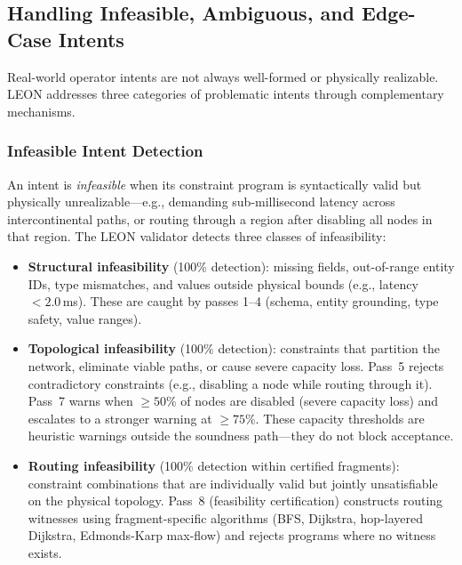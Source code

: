 
\subsection{Handling Infeasible, Ambiguous, and Edge-Case Intents}
\label{sec:infeasible_handling}

Real-world operator intents are not always well-formed or physically
realizable. LEON addresses three categories of problematic intents
through complementary mechanisms.

\subsubsection{Infeasible Intent Detection}

An intent is \textit{infeasible} when its constraint program is
syntactically valid but physically unrealizable---e.g., demanding
sub-millisecond latency across intercontinental paths, or routing through
a region after disabling all nodes in that region. The LEON validator
detects three classes of infeasibility:

\begin{itemize}
\item \textbf{Structural infeasibility} (100\% detection): missing fields,
out-of-range entity IDs, type mismatches, and values outside physical
bounds (e.g., latency $< 2.0$\,ms). These are caught by passes 1--4
(schema, entity grounding, type safety, value ranges).

\item \textbf{Topological infeasibility} (100\% detection): constraints
that partition the network, eliminate viable paths, or cause severe
capacity loss. Pass~5 rejects contradictory constraints (e.g., disabling
a node while routing through it). Pass~7 warns when $\geq 50\%$ of nodes are disabled (severe capacity
loss) and escalates to a stronger warning at $\geq 75\%$. These
capacity thresholds are heuristic warnings outside the soundness
path---they do not block acceptance.

\item \textbf{Routing infeasibility} (100\% detection within certified
fragments): constraint combinations that are individually valid but
jointly unsatisfiable on the physical topology. Pass~8 (feasibility
certification) constructs routing witnesses using fragment-specific
algorithms (BFS, Dijkstra, hop-layered Dijkstra, Edmonds-Karp max-flow)
and rejects programs where no witness exists.
\end{itemize}

